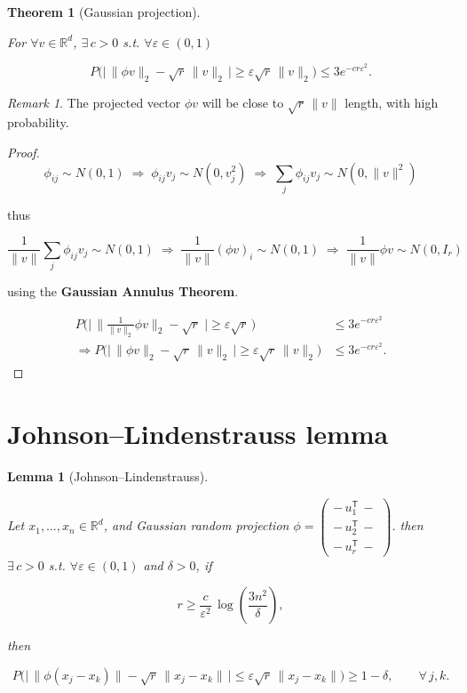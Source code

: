 \documentclass[
  letterpaper,
  DIV=11,
  numbers=noendperiod]{scrreprt}
\theoremstyle{definition}
\theoremstyle{plain}
\newtheorem{theorem}{Theorem}[chapter]
\theoremstyle{plain}
\theoremstyle{definition}
\theoremstyle{plain}
\theoremstyle{plain}
\newtheorem{lemma}{Lemma}[chapter]
\theoremstyle{remark}
\newtheorem*{remark}{Remark}
\begin{document}
\begin{theorem}[Gaussian
projection]\protect\hypertarget{thm-gaussian-proj}{}\label{thm-gaussian-proj}

For \(\forall v \in \mathbb{R}^d\), \(\exists\, c > 0\) s.t.
\(\forall \varepsilon \in (0,1)\)

\[
P\Big(\big|\,\|\phi v\|_2 - \sqrt{r}\,\|v\|_2\,\big| \ge \varepsilon \sqrt{r}\,\|v\|_2 \Big) \le 3 e^{-c r \varepsilon^2}.
\]

\end{theorem}

\begin{remark}
The projected vector \(\phi v\) will be close to \(\sqrt{r}\,\|v\|\)
length, with high probability.
\end{remark}

\begin{proof}
\[
\phi_{ij} \sim N(0,1) \;\Rightarrow\; \phi_{ij} v_j \sim N(0, v_j^2)
\;\Rightarrow\; \sum_j \phi_{ij} v_j \sim N(0, \|v\|^2)
\]

thus

\[
\frac{1}{\|v\|}\sum_j \phi_{ij} v_j \sim N(0,1)
\;\Rightarrow\; \frac{1}{\|v\|}(\phi v)_i \sim N(0,1)
\;\Rightarrow\; \frac{1}{\|v\|}\phi v \sim N(0, I_r)
\]

using the \textbf{Gaussian Annulus Theorem}.

\[
\begin{align}
P\Big(\big|\,\|\frac{1}{\|v\|_2}\phi v\|_2 - \sqrt{r}\,\,\big| \ge \varepsilon\sqrt{r}\, \Big) &\le 3 e^{-c r \varepsilon^2} \\
\Rightarrow P\Big(\big|\,\|\phi v\|_2 - \sqrt{r}\,\|v\|_2\,\big| \ge \varepsilon\sqrt{r}\,\|v\|_2 \Big) &\le 3 e^{-c r \varepsilon^2}.
\end{align}
\]
\end{proof}

\section{Johnson--Lindenstrauss lemma}\label{johnsonlindenstrauss-lemma}

\begin{lemma}[Johnson--Lindenstrauss]\protect\hypertarget{lem-jl}{}\label{lem-jl}

Let \(x_1, \dots, x_n \in \mathbb{R}^d\), and Gaussian random projection
\(\phi = \begin{pmatrix} -\,u_1^{\mathsf{T}}\,- \\ -\,u_2^{\mathsf{T}}\,- \\ -\,u_r^{\mathsf{T}}\,- \end{pmatrix}\).
then \(\exists\, c > 0\) s.t. \(\forall \varepsilon \in (0,1)\) and
\(\delta > 0\), if

\[
r \ge \frac{c}{\varepsilon^2}\,\log\!\left(\frac{3 n^2}{\delta}\right),
\]

then

\[
P\Big(\big|\,\|\phi (x_j -  x_k)\| - \sqrt{r}\,\|x_j - x_k\|\,\big| \le \varepsilon \sqrt{r}\,\|x_j - x_k\| \Big) \ge 1 - \delta,
\qquad \forall\, j, k .
\]

\end{lemma}
\end{document}
